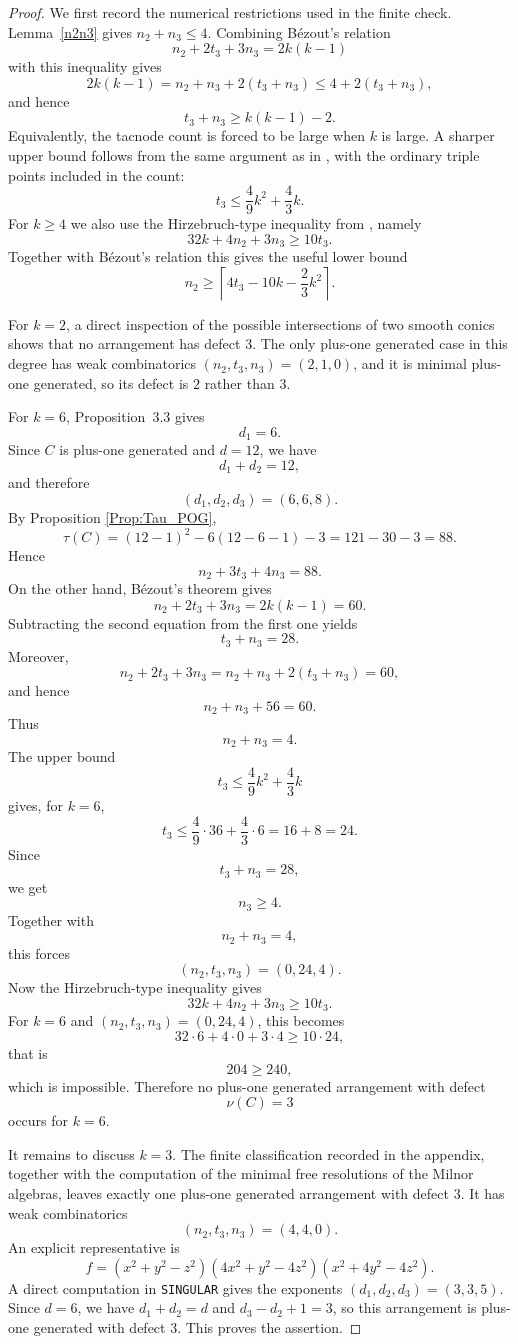\documentclass[11pt]{article}
\theoremstyle{plain}
\theoremstyle{definition}
\begin{document}
\begin{proof}
We first record the numerical restrictions used in the finite check. Lemma~\ref{n2n3} gives $n_2+n_3\leq4$. Combining B\'ezout's relation
\[
n_2+2t_3+3n_3=2k(k-1)
\]
with this inequality gives
\[
2k(k-1)=n_2+n_3+2(t_3+n_3)\leq4+2(t_3+n_3),
\]
and hence
\[
t_3+n_3\geq k(k-1)-2.
\]
Equivalently, the tacnode count is forced to be large when $k$ is large. A sharper upper bound follows from the same argument as in \cite[Remark 3.3]{Qarr}, with the ordinary triple points included in the count:
\[
t_3\leq \frac49k^2+\frac43k.
\]
For $k\geq4$ we also use the Hirzebruch-type inequality from \cite[Theorem 3.4]{BJP}, namely
\[
32k+4n_2+3n_3\geq10t_3.
\]
Together with B\'ezout's relation this gives the useful lower bound
\[
n_2\geq \left\lceil 4t_3-10k-\frac23k^2\right\rceil.
\]

For $k=2$, a direct inspection of the possible intersections of two smooth conics shows that no arrangement has defect $3$. The only plus-one generated case in this degree has weak combinatorics $(n_2,t_3,n_3)=(2,1,0)$, and it is minimal plus-one generated, so its defect is $2$ rather than $3$.


For \(k=6\), Proposition~3.3 gives
\[
d_1=6.
\]
Since \(C\) is plus-one generated and \(d=12\), we have
\[
d_1+d_2=12,
\]
and therefore
\[
(d_1,d_2,d_3)=(6,6,8).
\]
By Proposition \ref{Prop:Tau_POG},
\[
\tau(C)
=
(12-1)^2-6(12-6-1)-3
=
121-30-3
=
88.
\]
Hence
\[
n_2+3t_3+4n_3=88.
\]
On the other hand, B\'ezout's theorem gives
\[
n_2+2t_3+3n_3
=
2k(k-1)
=
60.
\]
Subtracting the second equation from the first one yields
\[
t_3+n_3=28.
\]
Moreover,
\[
n_2+2t_3+3n_3
=
n_2+n_3+2(t_3+n_3)
=
60,
\]
and hence
\[
n_2+n_3+56=60.
\]
Thus
\[
n_2+n_3=4.
\]
The upper bound
\[
t_3\leq \frac49k^2+\frac43k
\]
gives, for \(k=6\),
\[
t_3\leq \frac49\cdot 36+\frac43\cdot 6
=
16+8
=
24.
\]
Since
\[
t_3+n_3=28,
\]
we get
\[
n_3\geq 4.
\]
Together with
\[
n_2+n_3=4,
\]
this forces
\[
(n_2,t_3,n_3)=(0,24,4).
\]
Now the Hirzebruch-type inequality gives
\[
32k+4n_2+3n_3\geq 10t_3.
\]
For \(k=6\) and \((n_2,t_3,n_3)=(0,24,4)\), this becomes
\[
32\cdot 6+4\cdot 0+3\cdot 4\geq 10\cdot 24,
\]
that is
\[
204\geq 240,
\]
which is impossible. Therefore no plus-one generated arrangement with defect
\[
\nu(C)=3
\]
occurs for \(k=6\).


It remains to discuss $k=3$. The finite classification recorded in the appendix, together with the computation of the minimal free resolutions of the Milnor algebras, leaves exactly one plus-one generated arrangement with defect $3$. It has weak combinatorics
\[
(n_2,t_3,n_3)=(4,4,0).
\]
An explicit representative is
\[
f=(x^2+y^2-z^2)(4x^2+y^2-4z^2)(x^2+4y^2-4z^2).
\]
A direct computation in \texttt{SINGULAR} gives the exponents $(d_1,d_2,d_3)=(3,3,5)$. Since $d=6$, we have $d_1+d_2=d$ and $d_3-d_2+1=3$, so this arrangement is plus-one generated with defect $3$. This proves the assertion.
\end{proof}
\end{document}
